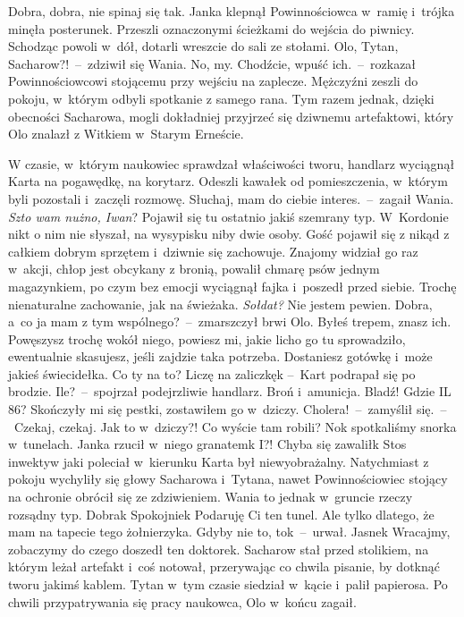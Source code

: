 \documentclass[../MAIN.tex]{subfiles}
\begin{document}
\xx Dobra, dobra, nie spinaj się tak.
\qd
\hspace{15.7em}Janka klepnął Powinnościowca w~ramię i~trójka minęła posterunek. Przeszli oznaczonymi ścieżkami do wejścia do piwnicy. Schodząc powoli w~dół, dotarli wreszcie do sali ze stołami.
\sx Olo, Tytan, Sacharow?!~--~zdziwił się Wania.
\xx No, my.
\xx Chodźcie, wpuść ich.~--~rozkazał Powinnościowcowi stojącemu przy wejściu na zaplecze.
\qm
Mężczyźni zeszli do pokoju, w~którym odbyli spotkanie z samego rana. Tym razem jednak, dzięki obecności Sacharowa, mogli dokładniej przyjrzeć się dziwnemu artefaktowi, który Olo znalazł z Witkiem w~Starym Erneście.

W czasie, w~którym naukowiec sprawdzał właściwości tworu, handlarz wyciągnął Karta na pogawędkę, na korytarz. Odeszli kawałek od pomieszczenia, w~którym byli pozostali i~zaczęli rozmowę.
\sx Słuchaj, mam do ciebie interes.~--~zagaił Wania.
\xx \textit{Szto wam nużno, Iwan}?
\xx Pojawił się tu ostatnio jakiś szemrany typ. W~Kordonie nikt o nim nie słyszał, na wysypisku niby dwie osoby. Gość pojawił się z nikąd z całkiem dobrym sprzętem i~dziwnie się zachowuje. Znajomy widział go raz w~akcji, chłop jest obcykany z bronią, powalił chmarę psów jednym magazynkiem, po czym bez emocji wyciągnął fajka i~poszedł przed siebie. Trochę nienaturalne zachowanie, jak na świeżaka.
\xx \textit{Sołdat?}
\xx Nie jestem pewien.
\xx Dobra, a~co ja mam z tym wspólnego?~--~zmarszczył brwi Olo.
\xx Byłeś trepem, znasz ich. Powęszysz trochę wokół niego, powiesz mi, jakie licho go tu sprowadziło, ewentualnie skasujesz, jeśli zajdzie taka potrzeba. Dostaniesz gotówkę i~może jakieś świecidełka. Co ty na to?
\xx Liczę na zaliczkę\3k --~Kart podrapał się po brodzie.
\xx Ile?~--~spojrzał podejrzliwie handlarz.
\xx Broń i~amunicja.
\xx Bladź! Gdzie IL 86?
\xx Skończyły mi się pestki, zostawiłem go w~dziczy.
\xx Cholera!~--~zamyślił się.~--~Czekaj, czekaj. Jak to w~dziczy?! Co wyście tam robili?
\xx No\3k spotkaliśmy snorka w~tunelach. Janka rzucił w~niego granatem\3k
\xx I?!
\xx Chyba się zawalił\3k
\qd
\hspace{10.4em}Stos inwektyw jaki poleciał w~kierunku Karta był niewyobrażalny. Natychmiast z pokoju wychyliły się głowy Sacharowa i~Tytana, nawet Powinnościowiec stojący na ochronie obrócił się ze zdziwieniem. Wania to jednak w~gruncie rzeczy rozsądny typ.
\sx Dobra\3k Spokojnie\3k Podaruję Ci ten tunel. Ale tylko dlatego, że mam na tapecie tego żołnierzyka. Gdyby nie to, to\3k~--~urwał.
\xx Jasne\3k
\xx Wracajmy, zobaczymy do czego doszedł ten doktorek.
\qd
\hspace{25.3em}Sacharow stał przed stolikiem, na którym leżał artefakt i~coś notował, przerywając co chwila pisanie, by dotknąć tworu jakimś kablem. Tytan w~tym czasie siedział w~kącie i~palił papierosa. Po chwili przypatrywania się pracy naukowca, Olo w~końcu zagaił.
\end{document}
